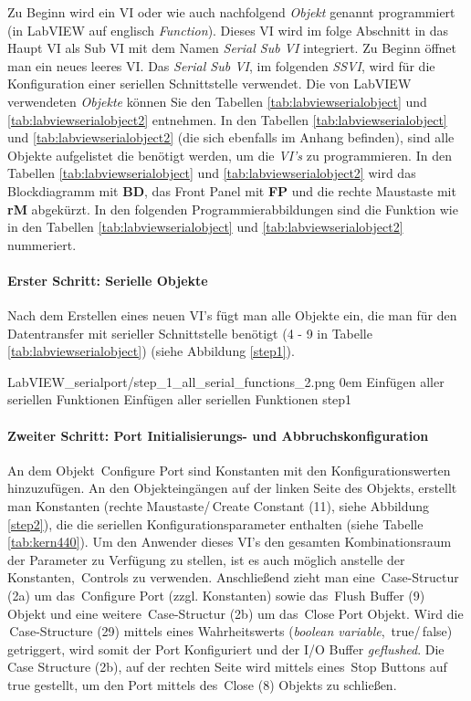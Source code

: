 Zu Beginn wird ein VI oder wie auch nachfolgend \textit{Objekt} genannt programmiert (in LabVIEW auf englisch \textit{Function}). Dieses VI wird im folge Abschnitt in das Haupt VI als Sub VI mit dem Namen \textit{Serial Sub VI} integriert. Zu Beginn öffnet man ein neues leeres VI. Das \textit{Serial Sub VI}, im folgenden \textit{SSVI}, wird für die Konfiguration einer seriellen Schnittstelle verwendet. Die von LabVIEW verwendeten \textit{Objekte} können Sie den Tabellen \ref{tab:labviewserialobject} und \ref{tab:labviewserialobject2} entnehmen. In den Tabellen \ref{tab:labviewserialobject} und \ref{tab:labviewserialobject2} (die sich ebenfalls im Anhang befinden), sind alle Objekte aufgelistet die benötigt werden, um die \textit{VI's} zu programmieren. In den Tabellen \ref{tab:labviewserialobject} und \ref{tab:labviewserialobject2} wird das Blockdiagramm mit \textbf{BD}, das Front Panel mit \textbf{FP} und die rechte Maustaste mit \textbf{rM} abgekürzt. In den folgenden Programmierabbildungen sind die Funktion wie in den Tabellen \ref{tab:labviewserialobject} und \ref{tab:labviewserialobject2} nummeriert.\\

\paragraph{Erster Schritt: Serielle Objekte} Nach dem Erstellen eines neuen VI's fügt man alle Objekte ein, die man für den Datentransfer mit serieller Schnittstelle benötigt (4 - 9 in Tabelle \ref{tab:labviewserialobject}) (siehe Abbildung \ref{step1}). 

{LabVIEW_serialport/step_1_all_serial_functions_2.png}
{0em}
{Einfügen aller seriellen Funktionen}
{Einfügen aller seriellen Funktionen}
{step1}


\paragraph{Zweiter Schritt: Port Initialisierungs- und Abbruchskonfiguration} An dem Objekt \,{\Menlo Configure Port} sind Konstanten mit den Konfigurationswerten hinzuzufügen. An den Objekteingängen auf der linken Seite des Objekts, erstellt man Konstanten (rechte Maustaste/\,{\Menlo Create Constant} (11), siehe Abbildung \ref{step2}), die die seriellen Konfigurationsparameter enthalten (siehe Tabelle \ref{tab:kern440}). Um den Anwender dieses VI's den gesamten Kombinationsraum der Parameter zu Verfügung zu stellen, ist es auch möglich anstelle der Konstanten, \,{\Menlo Controls} zu verwenden. Anschließend zieht man eine \,{\Menlo Case-Structur} (2a) um das \,{\Menlo Configure Port} (zzgl. Konstanten) sowie das \,{\Menlo Flush Buffer} (9) Objekt und eine weitere \,{\Menlo Case-Structur} (2b) um das \,{\Menlo Close Port} Objekt. Wird die \,{\Menlo Case-Structure} (29) mittels eines Wahrheitswerts (\textit{boolean variable}, \,{\Menlo true}/\,{\Menlo false}) getriggert, wird somit der Port Konfiguriert und der I/O Buffer \textit{geflushed}. Die \,{\Menlo Case Structure} (2b), auf der rechten Seite wird mittels eines \,{\Menlo Stop Buttons} auf \,{\Menlo true} gestellt, um den Port mittels des \,{\Menlo Close} (8) Objekts zu schließen.\\

